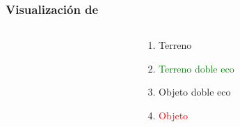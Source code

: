 \begin{frame}
 \frametitle{Visualización de \LARGE{}}
\begin{columns}
  \begin{column}{0.65\textwidth}
    \begin{center}
   \end{center}
  \end{column}
  \begin{column}{0.35\textwidth}
	\begin{enumerate}
	 \item \textcolor{yellow!95!black}{Terreno}
	 \item \textcolor{green}{Terreno doble eco}
	 \item \textcolor{blue!90!black}{Objeto doble eco}
	 \item \textcolor{red}{Objeto}
	\end{enumerate}
  \end{column}
\end{columns}
\end{frame}
